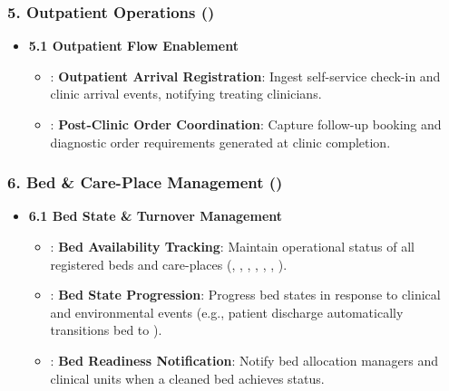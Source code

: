 \subsubsection*{5. Outpatient Operations (\texttt{})}
\label{rad:enabling:502}

\begin{itemize}

\item 
\textbf{5.1 Outpatient Flow Enablement}


\begin{itemize}

\item 
\texttt{}: \textbf{Outpatient Arrival Registration}: Ingest self-service check-in and clinic arrival events, notifying treating clinicians.



\item 
\texttt{}: \textbf{Post-Clinic Order Coordination}: Capture follow-up booking and diagnostic order requirements generated at clinic completion.



\end{itemize}


\end{itemize}
\label{rad:enabling:506}
\subsubsection*{6. Bed \& Care-Place Management (\texttt{})}
\label{rad:enabling:507}

\begin{itemize}

\item 
\textbf{6.1 Bed State \& Turnover Management}


\begin{itemize}

\item 
\texttt{}: \textbf{Bed Availability Tracking}: Maintain operational status of all registered beds and care-places (\texttt{}, \texttt{}, \texttt{}, \texttt{}, \texttt{}, \texttt{}, \texttt{}).



\item 
\texttt{}: \textbf{Bed State Progression}: Progress bed states in response to clinical and environmental events (e.g., patient discharge automatically transitions bed to \texttt{}).



\item 
\texttt{}: \textbf{Bed Readiness Notification}: Notify bed allocation managers and clinical units when a cleaned bed achieves \texttt{} status.



\end{itemize}


\end{itemize}
\label{rad:enabling:512}
